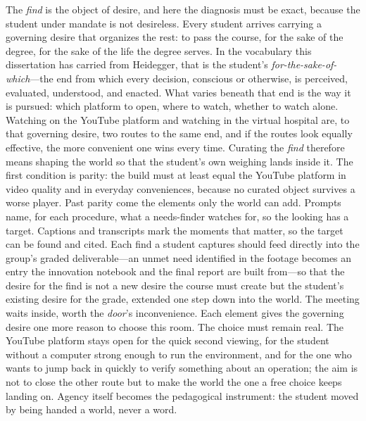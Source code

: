 The \textit{find} is the object of desire, and here the diagnosis must
be exact, because the student under mandate is not desireless. Every
student arrives carrying a governing desire that organizes the rest:
to pass the course, for the sake of the degree, for the sake of the
life the degree serves. In the vocabulary this dissertation has
carried from Heidegger, that is the student's
\textit{for-the-sake-of-which}---the end from which every decision,
conscious or otherwise, is perceived, evaluated, understood, and
enacted. What varies beneath that end is the way it is pursued: which
platform to open, where to watch, whether to watch alone. Watching on
the YouTube platform and watching in the virtual hospital are, to that
governing desire, two routes to the same end, and if the routes look
equally effective, the more convenient one wins every time. Curating the \textit{find} therefore means shaping the world so
that the student's own weighing lands inside it. The first condition
is parity: the build must at least equal the YouTube platform in video
quality and in everyday conveniences, because no curated object
survives a worse player. Past parity come the elements only the world
can add. Prompts name, for each procedure, what a needs-finder watches
for, so the looking has a target. Captions and transcripts mark the
moments that matter, so the target can be found and cited. Each find a student captures should feed directly into the group's
graded deliverable---an unmet need identified in the footage becomes an
entry the innovation notebook and the final report are built from---so
that the desire for the find is not a new desire the course must create
but the student's existing desire for the grade, extended one step down
into the world. The meeting waits inside, worth the
\textit{door}'s inconvenience. Each element gives the governing desire
one more reason to choose this room. The choice
must remain real. The YouTube platform stays open for the quick second
viewing, for the student without a computer strong enough to run the
environment, and for the one who wants to jump back in quickly to
verify something about an operation; the aim is not to close the other
route but to make the world the one a free choice keeps landing on.
Agency itself becomes the pedagogical instrument: the student moved by
being handed a world, never a word.

